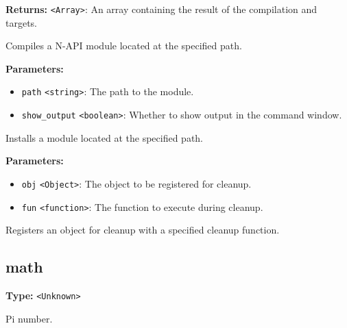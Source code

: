 \documentclass[12pt,a4paper]{article}
\begin{document}
\noindent \textbf{Returns:} \texttt{<Array>}: An array containing the result of the compilation and targets.

\noindent Compiles a N-API module located at the specified path.

\vspace{5mm}
\noindent {}


\noindent \textbf{Parameters:}
\begin{itemize}
  \item \texttt{path} \texttt{<string>}: The path to the module.
  \item \texttt{show\_output} \texttt{<boolean>}: Whether to show output in the command window.
\end{itemize}

\noindent Installs a module located at the specified path.

\vspace{5mm}
\noindent {}


\noindent \textbf{Parameters:}
\begin{itemize}
  \item \texttt{obj} \texttt{<Object>}: The object to be registered for cleanup.
  \item \texttt{fun} \texttt{<function>}: The function to execute during cleanup.
\end{itemize}

\noindent Registers an object for cleanup with a specified cleanup function.


\subsection{math}
\vspace{5mm}
\noindent {}\vspace{4mm}


\noindent \textbf{Type:} \texttt{<Unknown>}

\noindent Pi number.

\vspace{5mm}
\noindent {}\vspace{4mm}
\end{document}
